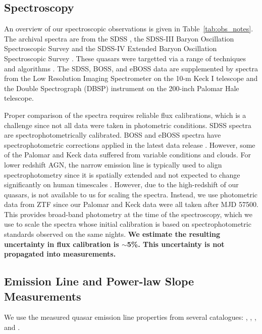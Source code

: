 \documentclass[fleqn,usenatbib]{mnras}
\begin{document}



\subsection{Spectroscopy}
An overview of our spectroscopic observations is given in
Table~\ref{tab:obs_notes}.  The archival spectra are from the SDSS
\citep{Stoughton2002, DR7, Schneider2010}, the SDSS-III Baryon
Oscillation Spectroscopic Survey \citep[BOSS; ][]{Eisenstein2011,
Dawson2013, Smee2013, Alam2015, Paris2017} and the SDSS-IV Extended
Baryon Oscillation Spectroscopic Survey \citep[eBOSS; ][]{Dawson2016,
Abolfathi2018, Paris2018}.  These quasars were targetted via a range
of techniques and algorithms \citep[see][]{Richards2002, Ross2012,
Myers2015}. The SDSS, BOSS, and eBOSS data are supplemented by spectra
from the Low Resolution Imaging Spectrometer \citep[LRIS; ][]{Oke1995}
on the 10-m Keck {\sc I} telescope and the Double Spectrograph (DBSP)
instrument on the 200-inch Palomar Hale telescope.

Proper comparison of the spectra requires reliable flux calibrations,
which is a challenge since not all data were taken in photometric
conditions.  SDSS spectra are spectrophotometrically calibrated.  BOSS
and eBOSS spectra have spectrophotometric corrections applied in the
latest data release \citep{Hutchinson2016, Jensen2016, Margala2016}.
However, some of the Palomar and Keck data suffered from variable
conditions and clouds.  For lower redshift AGN, the narrow \oiii
emission line is typically used to align spectrophotometry since it is
spatially extended and not expected to change significantly on human
timescales \citep[e.g.,][]{Barth2011}. However, due to the
high-redshift of our quasars, \oiii is not available to us for
scaling the spectra.  Instead, we use photometric data from ZTF
since our Palomar and Keck data were all taken after MJD 57500.  This
provides broad-band photometry at the time of the spectroscopy, which
we use to scale the spectra whose initial calibration is based on
spectrophotometric standards observed on the same nights.  {\bf We 
  estimate the resulting uncertainty in flux calibration is $\sim$5\%.
  This uncertainty is not propagated into measurements.}


\subsection{Emission Line and Power-law Slope Measurements}
We use the measured quasar emission line properties from several
catalogues: \citet{Shen2011}, \citet{Hamann2017},
\citet{Kozlowski2017}, and \citet{Calderone2017}.
\end{document}
